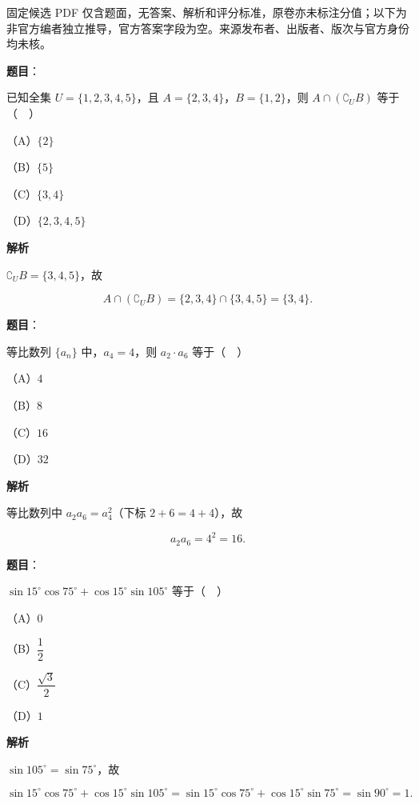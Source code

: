 

\begin{gktip}
固定候选 PDF 仅含题面，无答案、解析和评分标准，原卷亦未标注分值；以下为非官方编者独立推导，官方答案字段为空。来源发布者、出版者、版次与官方身份均未核。
\end{gktip}

\begin{answer}

\textbf{题目}：

已知全集 $U=\{1,2,3,4,5\}$，且 $A=\{2,3,4\}$，$B=\{1,2\}$，则 $A\cap(\complement_UB)$ 等于（　）

（A）$\{2\}$

（B）$\{5\}$

（C）$\{3,4\}$

（D）$\{2,3,4,5\}$

\textbf{解析}

$\complement_UB=\{3,4,5\}$，故

\nopagebreak[4]
\[A\cap(\complement_UB)=\{2,3,4\}\cap\{3,4,5\}=\{3,4\}.\]


\end{answer}
\begin{answer}

\textbf{题目}：

等比数列 $\{a_n\}$ 中，$a_4=4$，则 $a_2\cdot a_6$ 等于（　）

（A）$4$

（B）$8$

（C）$16$

（D）$32$

\textbf{解析}

等比数列中 $a_2a_6=a_4^2$（下标 $2+6=4+4$），故

\nopagebreak[4]
\[a_2a_6=4^2=16.\]


\end{answer}
\begin{answer}

\textbf{题目}：

$\sin15^\circ\cos75^\circ+\cos15^\circ\sin105^\circ$ 等于（　）

（A）$0$

（B）$\dfrac12$

（C）$\dfrac{\sqrt3}2$

（D）$1$

\textbf{解析}

$\sin105^\circ=\sin75^\circ$，故

\nopagebreak[4]
\[\sin15^\circ\cos75^\circ+\cos15^\circ\sin105^\circ=\sin15^\circ\cos75^\circ+\cos15^\circ\sin75^\circ=\sin90^\circ=1.\]


\end{answer}
